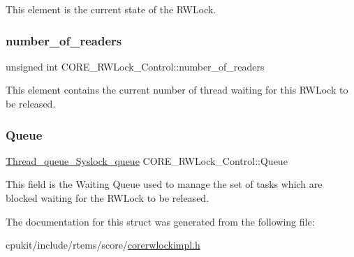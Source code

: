 This element is the current state of the R\+W\+Lock. \mbox{\label{structCORE__RWLock__Control_ab8abb29ef0dcb206089b4806c0aac999}} 
\subsubsection{\texorpdfstring{number\_of\_readers}{number\_of\_readers}}
{\footnotesize\ttfamily unsigned int C\+O\+R\+E\+\_\+\+R\+W\+Lock\+\_\+\+Control\+::number\+\_\+of\+\_\+readers}

This element contains the current number of thread waiting for this R\+W\+Lock to be released. \mbox{\label{structCORE__RWLock__Control_a7c5ab480ce03e1253395130577270f06}} 
\subsubsection{\texorpdfstring{Queue}{Queue}}
{\footnotesize\ttfamily \mbox{\hyperlink{structThread__queue__Syslock__queue}{Thread\+\_\+queue\+\_\+\+Syslock\+\_\+queue}} C\+O\+R\+E\+\_\+\+R\+W\+Lock\+\_\+\+Control\+::\+Queue}

This field is the Waiting Queue used to manage the set of tasks which are blocked waiting for the R\+W\+Lock to be released. 

The documentation for this struct was generated from the following file\+:\begin{DoxyCompactItemize}
\item 
cpukit/include/rtems/score/\mbox{\hyperlink{corerwlockimpl_8h}{corerwlockimpl.\+h}}\end{DoxyCompactItemize}
